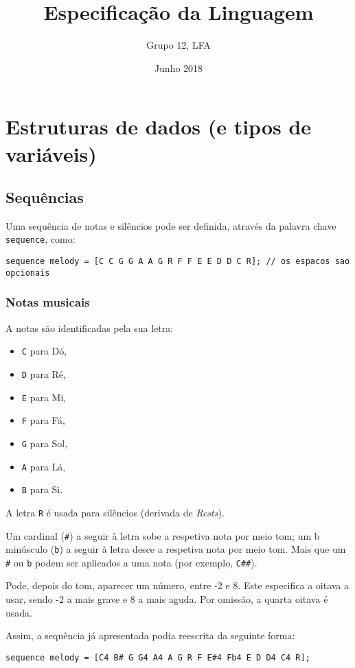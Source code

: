\documentclass{article}
\title{Especificação da Linguagem}
\author{Grupo 12, LFA}
\date{Junho 2018}
\begin{document}
\maketitle

\tableofcontents
\vspace{2cm} %

\section{Estruturas de dados (e tipos de variáveis)} \label{variables}
\subsection{Sequências}
Uma sequência de notas e silêncios pode ser definida, através da palavra chave \texttt{sequence}, como:
\begin{lstlisting} 
sequence melody = [C C G G A A G R F F E E D D C R]; // os espacos sao opcionais
\end{lstlisting}

\subsubsection{Notas musicais}
A notas são identificadas pela sua letra:
\begin{itemize}
    \item \texttt{C} para Dó,
    \item \texttt{D} para Ré,
    \item \texttt{E} para Mi,
    \item \texttt{F} para Fá,
    \item \texttt{G} para Sol,
    \item \texttt{A} para Lá,
    \item \texttt{B} para Si.
\end{itemize}
A letra \texttt{R} é usada para silêncios (derivada de \textit{Rests}).

Um cardinal (\texttt{\#}) a seguir à letra sobe a respetiva nota por meio tom; um b minúsculo (\texttt{b}) a seguir à letra desce a respetiva nota por meio tom. Mais que um \texttt{\#} ou \texttt{b} podem ser aplicados a uma nota (por exemplo, \texttt{C\#\#}).

Pode, depois do tom, aparecer um número, entre -2 e 8. Este especifica a oitava a usar, sendo -2 a mais grave e 8 a mais aguda. Por omissão, a quarta oitava é usada.

Assim, a sequência já apresentada podia reescrita da seguinte forma:
\begin{lstlisting} 
sequence melody = [C4 B# G G4 A4 A G R F E#4 Fb4 E D D4 C4 R];
\end{lstlisting}
\end{document}

